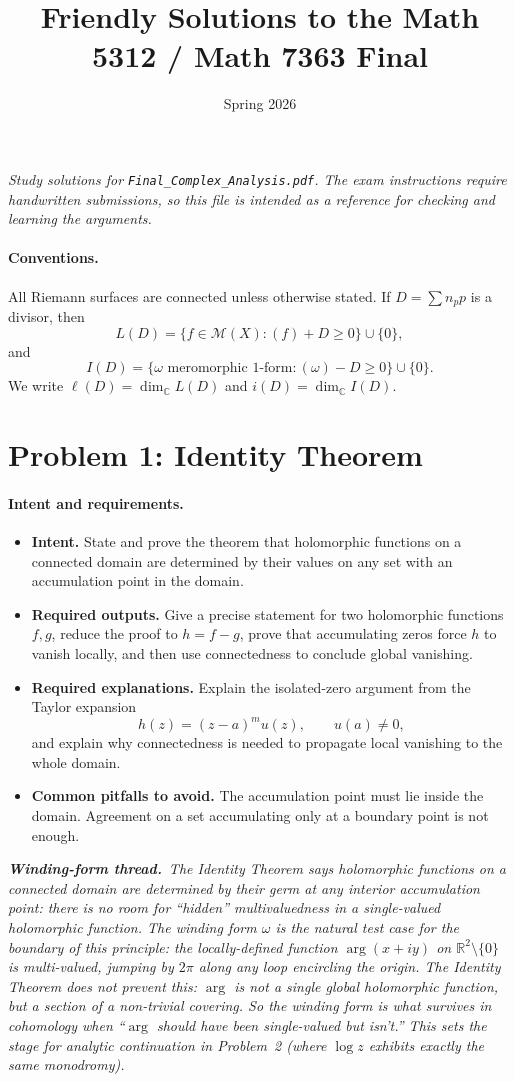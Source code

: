 \documentclass[11pt]{article}
\title{Friendly Solutions to the Math 5312 / Math 7363 Final}
\author{}
\date{Spring 2026}
\newcommand{\windingnote}[1]{%
\par\smallskip
\noindent\begin{minipage}{\linewidth}%
\color{windingblue}\small%
\textbf{\textit{Winding-form thread.}}\ \textit{#1}%
\end{minipage}\par\smallskip%
}
\newcommand{\C}{\mathbb{C}}
\newcommand{\R}{\mathbb{R}}
\newenvironment{intentrequirements}{%
\paragraph{Intent and requirements.}
\begin{itemize}[leftmargin=*, itemsep=0.25em]
}{%
\end{itemize}
}
\begin{document}
\maketitle

\begin{center}
\emph{Study solutions for \texttt{Final\_Complex\_Analysis.pdf}. The exam instructions require handwritten submissions, so this file is intended as a reference for checking and learning the arguments.}
\end{center}

\paragraph{Conventions.}
All Riemann surfaces are connected unless otherwise stated. If $D=\sum n_p p$ is a divisor, then
\[
 L(D)=\{f\in \mathcal M(X):(f)+D\geq0\}\cup\{0\},
\]
and
\[
 I(D)=\{\omega\text{ meromorphic }1\text{-form}:(\omega)-D\geq0\}\cup\{0\}.
\]
We write $\ell(D)=\dim_\C L(D)$ and $i(D)=\dim_\C I(D)$.

\section*{Problem 1: Identity Theorem}

\begin{intentrequirements}
\item \textbf{Intent.} State and prove the theorem that holomorphic functions on a connected domain are determined by their values on any set with an accumulation point in the domain.
\item \textbf{Required outputs.} Give a precise statement for two holomorphic functions $f,g$, reduce the proof to $h=f-g$, prove that accumulating zeros force $h$ to vanish locally, and then use connectedness to conclude global vanishing.
\item \textbf{Required explanations.} Explain the isolated-zero argument from the Taylor expansion
\[
 h(z)=(z-a)^m u(z),\qquad u(a)\neq0,
\]
and explain why connectedness is needed to propagate local vanishing to the whole domain.
\item \textbf{Common pitfalls to avoid.} The accumulation point must lie inside the domain. Agreement on a set accumulating only at a boundary point is not enough.
\end{intentrequirements}

\windingnote{The Identity Theorem says holomorphic functions on a connected domain are determined by their germ at any interior accumulation point: there is no room for ``hidden'' multivaluedness in a single-valued holomorphic function. The winding form $\omega$ is the natural test case for the boundary of this principle: the locally-defined function $\arg(x+iy)$ on $\R^2\setminus\{0\}$ is \emph{multi-valued}, jumping by $2\pi$ along any loop encircling the origin. The Identity Theorem does \emph{not} prevent this: $\arg$ is not a single global holomorphic function, but a section of a non-trivial covering. So the winding form is what survives in cohomology when ``$\arg$ should have been single-valued but isn't.'' This sets the stage for analytic continuation in Problem~2 (where $\log z$ exhibits exactly the same monodromy).}
\end{document}
